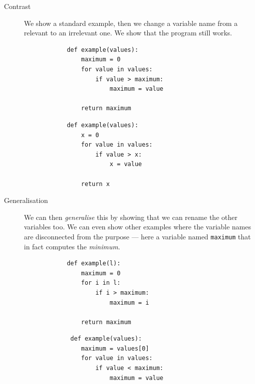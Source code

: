 \begin{description}
    \item [Contrast] We show a standard example, then we change a variable 
name from a relevant to an irrelevant one. We show that the program 
still works.
    
    \hfill
    \begin{minipage}[t]{0.45\columnwidth}
        \begin{verbatim}
            def example(values):
                maximum = 0
                for value in values:
                    if value > maximum:
                        maximum = value
    
                return maximum
        \end{verbatim}
    \end{minipage}
\hfill
    \begin{minipage}[t]{0.45\columnwidth}
        \begin{verbatim}
            def example(values):
                x = 0
                for value in values:
                    if value > x:
                        x = value

                return x
      \end{verbatim}
    \end{minipage}
\newline
    
    \item [Generalisation] We can then \emph{generalise} this by showing
that we can rename the other variables too. We can even show other
examples where the variable names are disconnected from the purpose --- here a
variable named \texttt{maximum} that in fact computes the
\emph{minimum}.

    
    \hfill
    \begin{minipage}[t]{0.45\columnwidth}
        \begin{verbatim}
            def example(l):
                maximum = 0
                for i in l:
                    if i > maximum:
                        maximum = i
    
                return maximum
        \end{verbatim}
    \end{minipage}
\hfill
    \begin{minipage}[t]{0.45\columnwidth}
        \begin{verbatim}
             def example(values):
                maximum = values[0]
                for value in values:
                    if value < maximum:
                        maximum = value
    

\end{verbatim}
\end{minipage}
\end{description}
